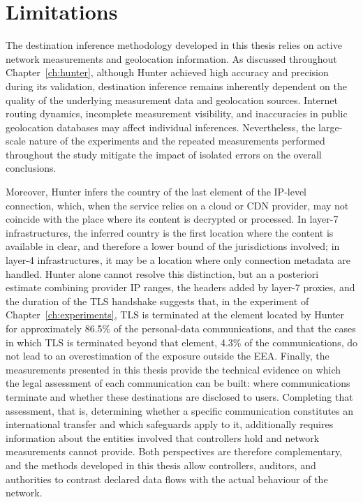\section{Limitations}
\label{sc:conclusion_limitations}

The destination inference methodology developed in this thesis relies on active network measurements and geolocation information. As discussed throughout Chapter~\ref{ch:hunter}, although Hunter achieved high accuracy and precision during its validation, destination inference remains inherently dependent on the quality of the underlying measurement data and geolocation sources. Internet routing dynamics, incomplete measurement visibility, and inaccuracies in public geolocation databases may affect individual inferences. Nevertheless, the large-scale nature of the experiments and the repeated measurements performed throughout the study mitigate the impact of isolated errors on the overall conclusions.

Moreover, Hunter infers the country of the last element of the IP-level connection, which, when the service relies on a cloud or CDN provider, may not coincide with the place where its content is decrypted or processed. In layer-7 infrastructures, the inferred country is the first location where the content is available in clear, and therefore a lower bound of the jurisdictions involved; in layer-4 infrastructures, it may be a location where only connection metadata are handled. Hunter alone cannot resolve this distinction, but an a posteriori estimate combining provider IP ranges, the headers added by layer-7 proxies, and the duration of the TLS handshake suggests that, in the experiment of Chapter~\ref{ch:experiments}, TLS is terminated at the element located by Hunter for approximately 86.5\% of the personal-data communications, and that the cases in which TLS is terminated beyond that element, 4.3\% of the communications, do not lead to an overestimation of the exposure outside the EEA. Finally, the measurements presented in this thesis provide the technical evidence on which the legal assessment of each communication can be built: where communications terminate and whether these destinations are disclosed to users. Completing that assessment, that is, determining whether a specific communication constitutes an international transfer and which safeguards apply to it, additionally requires information about the entities involved that controllers hold and network measurements cannot provide. Both perspectives are therefore complementary, and the methods developed in this thesis allow controllers, auditors, and authorities to contrast declared data flows with the actual behaviour of the network.

